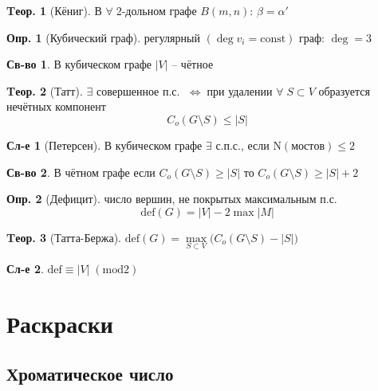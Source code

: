 \documentclass[a4paper,12pt]{article}
\numberwithin{figure}{section}
\theoremstyle{definition}
\newtheorem{definition}{Опр.}[section]
\newtheorem*{property}{Св-во}  %
\theoremstyle{definition}
\newtheorem{theorem}{Tеор.}[section]
\newtheorem*{corollary}{Сл-е} %
\def\iiff{$\;\Longleftrightarrow\;$}
\def\iiany{$\forall\;$}
\begin{document}
\begin{theorem}[Кёниг]
	В \iiany 2-дольном графе $B(m,n)$: $\beta = \alpha'$
\end{theorem}

\begin{definition}[Кубический граф]
	регулярный $(\deg v_i = \mathrm{const})$ граф: $\deg = 3$
\end{definition}

\begin{property}
	В кубическом графе $|V|$ -- чётное
\end{property}

\begin{theorem}[Татт]
	$\exists$ совершенное п.с. \iiff при удалении \iiany $S \subset V$ образуется нечётных компонент
	\[ C_{o}(G \setminus S) \leqslant |S| \]
\end{theorem}

\begin{corollary}[Петерсен]
	В кубическом графе $\exists$ с.п.с., если $\mathrm{N}(мостов) \leqslant 2$
\end{corollary}

\begin{property}
В чётном графе если $C_{o}(G \setminus S) \ge |S|$ то $C_{o}(G \setminus S) \geqslant |S|+2$
\end{property}

\begin{definition}[Дефицит]
	число вершин, не покрытых максимальным п.с.
	\[ \mathrm{def}(G)=|V|-2\max|M| \]
\end{definition}

\begin{theorem}[Татта-Бержа]
	$ \mathrm{def}(G) = \max\limits_{S \subset V} \big( C_{o}(G \setminus S) - \left|S\right| \big) $
\end{theorem}

\begin{corollary}
	$ \mathrm{def} \equiv |V| \; (\mathrm{mod} 2) $
\end{corollary}



\section{Раскраски}


\subsection{Хроматическое число}
\end{document}
